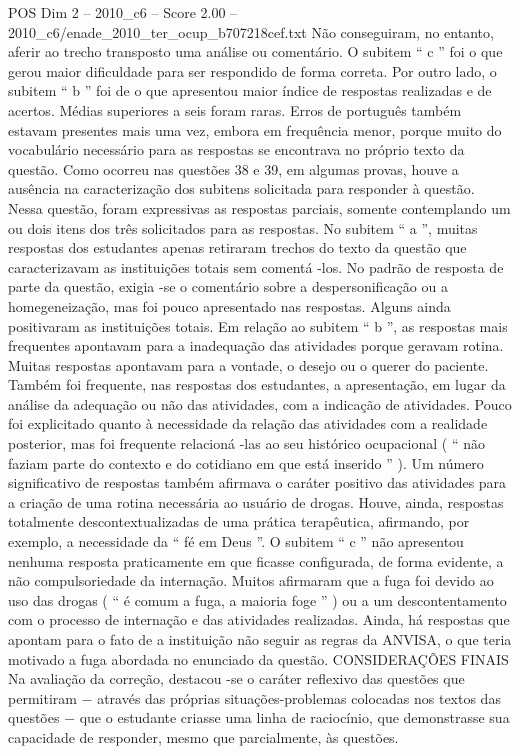 \begin{textsample}{POS Dim 2 – 2010\_c6 – Score 2.00 – 2010\_c6/enade\_2010\_ter\_ocup\_b707218cef.txt}
Não conseguiram, no entanto, aferir ao trecho transposto uma análise ou comentário.
O subitem “ c ” foi o que gerou maior dificuldade para ser respondido de forma correta.
Por outro lado, o subitem “ b ” foi de o que apresentou maior índice de respostas realizadas e de acertos.
Médias superiores a seis foram raras.
Erros de português também estavam presentes mais uma vez, embora em frequência menor, porque muito do vocabulário necessário para as respostas se encontrava no próprio texto da questão.
Como ocorreu nas questões 38 e 39, em algumas provas, houve a ausência na caracterização dos subitens solicitada para responder à questão.
Nessa questão, foram expressivas as respostas parciais, somente contemplando um ou dois itens dos três solicitados para as respostas.
No subitem “ a ”, muitas respostas dos estudantes apenas retiraram trechos do texto da questão que caracterizavam as instituições totais sem comentá -los.
No padrão de resposta de parte da questão, exigia -se o comentário sobre a despersonificação ou a homegeneização, mas foi pouco apresentado nas respostas.
Alguns ainda positivaram as instituições totais.
Em relação ao subitem “ b ”, as respostas mais frequentes apontavam para a inadequação das atividades porque geravam rotina.
Muitas respostas apontavam para a vontade, o desejo ou o querer do paciente.
Também foi frequente, nas respostas dos estudantes, a apresentação, em lugar da análise da adequação ou não das atividades, com a indicação de atividades.
Pouco foi explicitado quanto à necessidade da relação das atividades com a realidade posterior, mas foi frequente relacioná -las ao seu histórico ocupacional ( “ não faziam parte do contexto e do cotidiano em que está inserido ” ).
Um número significativo de respostas também afirmava o caráter positivo das atividades para a criação de uma rotina necessária ao usuário de drogas.
Houve, ainda, respostas totalmente descontextualizadas de uma prática terapêutica, afirmando, por exemplo, a necessidade da “ fé em Deus ”.
O subitem “ c ” não apresentou nenhuma resposta praticamente em que ficasse configurada, de forma evidente, a não compulsoriedade da internação.
Muitos afirmaram que a fuga foi devido ao uso das drogas ( “ é comum a fuga, a maioria foge ” ) ou a um descontentamento com o processo de internação e das atividades realizadas.
Ainda, há respostas que apontam para o fato de a instituição não seguir as regras da ANVISA, o que teria motivado a fuga abordada no enunciado da questão.
CONSIDERAÇÕES FINAIS Na avaliação da correção, destacou -se o caráter reflexivo das questões que permitiram − através das próprias situações-problemas colocadas nos textos das questões − que o estudante criasse uma linha de raciocínio, que demonstrasse sua capacidade de responder, mesmo que parcialmente, às questões.

\end{textsample}
